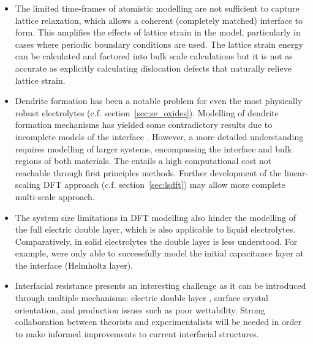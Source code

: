 \documentclass[../main.tex]{subfiles}
\begin{document}
\begin{itemize}
    \item The limited time-frames of atomistic modelling are not sufficient to capture lattice relaxation, which allows a coherent (completely matched) interface to form. This amplifies the effects of lattice strain in the model, particularly in cases where periodic boundary conditions are used. \cite{Lepley2015} The lattice strain energy can be calculated and factored into bulk scale calculations but it is not as accurate as explicitly calculating dislocation defects that naturally relieve lattice strain.\cite{Rodney2017, Clouet2020}
    \item Dendrite formation has been a notable problem for even the most physically robust electrolytes (c.f. section~\ref{sec:se_oxides}). Modelling of dendrite formation mechanisms has yielded some contradictory results due to incomplete models of the interface \cite{Tian2018, Gao2020, Canepa2018}. However, a more detailed understanding requires modelling of larger systems, encompassing the interface and bulk regions of both materials. The entails a high computational cost not reachable through first principles methods. Further development of the linear-scaling DFT approach (c.f. section~\ref{sec:lsdft}) may allow more complete multi-scale approach.
    \item The system size limitations in DFT modelling also hinder the modelling of the full electric double layer, which is also applicable to liquid electrolytes. Comparatively, in solid electrolytes the double layer is less understood. For example, \citeauthor{Tateyama2019} were only able to successfully model the initial capacitance layer at the interface (Helmholtz layer).\cite{Tateyama2019}
    \item Interfacial resistance presents an interesting challenge as it can be introduced through multiple mechanisms\cite{Jiang2019}: electric double layer \cite{Tateyama2019}, surface crystal orientation\cite{Okuno2020}, and production issues such as poor wettability\cite{Sharafi2017}. Strong collaboration between theorists and experimentalists will be needed in order to make informed improvements to current interfacial structures.
\end{itemize}
\end{document}
